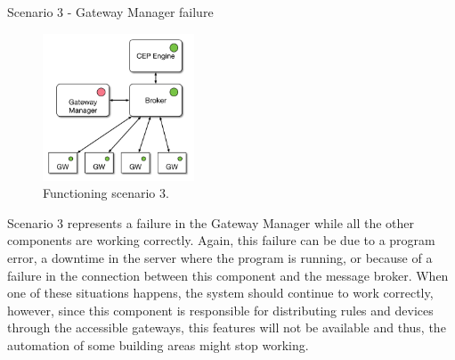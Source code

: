 \begin{Paragraph}{Scenario 3 - Gateway Manager failure}
	
	\begin{figure}[H]
		\centering
		\includegraphics[width=0.4\textwidth]{figures/fs5.png}
		\caption{Functioning scenario 3.}
		\label{fig:sc3}
	\end{figure}
	
	Scenario 3 represents a failure in the Gateway Manager while all the other components are working correctly. Again, this failure can be due to a program error, a downtime in the server where the program is running, or because of a failure in the connection between this component and the message broker. When one of these situations happens, the system should continue to work correctly, however, since this component is responsible for distributing rules and devices through the accessible gateways, this features will not be available and thus, the automation of some building areas might stop working.
	
\end{Paragraph}

